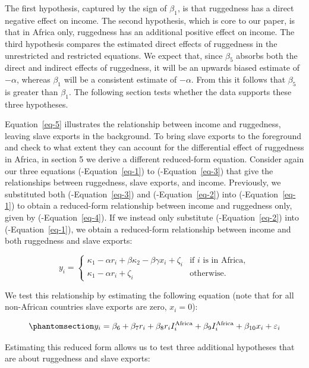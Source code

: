 \documentclass[
  letterpaper,
  DIV=11,
  numbers=noendperiod]{scrartcl}
\begin{document}
The first hypothesis, captured by the sign of \(\beta_1\), is that
ruggedness has a direct negative effect on income. The second
hypothesis, which is core to our paper, is that in Africa only,
ruggedness has an additional positive effect on income. The third
hypothesis compares the estimated direct effects of ruggedness in the
unrestricted and restricted equations. We expect that, since \(\beta_5\)
absorbs both the direct and indirect effects of ruggedness, it will be
an upwards biased estimate of \(-\alpha\), whereas \(\beta_1\) will be a
consistent estimate of \(-\alpha\). From this it follows that
\(\beta_5\) is greater than \(\beta_1\). The following section tests
whether the data supports these three hypotheses.

Equation~\ref{eq-5} illustrates the relationship between income and
ruggedness, leaving slave exports in the background. To bring slave
exports to the foreground and check to what extent they can account for
the differential effect of ruggedness in Africa, in section 5 we derive
a different reduced-form equation. Consider again our three equations
(-Equation~\ref{eq-1}) to (-Equation~\ref{eq-3}) that give the
relationships between ruggedness, slave exports, and income. Previously,
we substituted both (-Equation~\ref{eq-3}) and (-Equation~\ref{eq-2})
into (-Equation~\ref{eq-1}) to obtain a reduced-form relationship
between income and ruggedness only, given by (-Equation~\ref{eq-4}). If
we instead only substitute (-Equation~\ref{eq-2}) into
(-Equation~\ref{eq-1}), we obtain a reduced-form relationship between
income and both ruggedness and slave exports:

\[
y_i = \begin{cases}
\kappa_1 - \alpha r_i + \beta \kappa_2 - \beta \gamma x_i + \zeta_i &\text{if }i\text{ is in Africa}, \\
\kappa_1 - \alpha r_i + \zeta_i &\text{otherwise}.
\end{cases}
\]

We test this relationship by estimating the following equation (note
that for all non-African countries slave exports are zero, \(x_i = 0\)):

\begin{equation}\phantomsection\label{eq-7}{
y_i = \beta_6 + \beta_7 r_i + \beta_8 r_i I_i^\text{Africa} + \beta_9 I_i^\text{Africa} + \beta_{10}x_i + \varepsilon_i
}\end{equation}

Estimating this reduced form allows us to test three additional
hypotheses that are about ruggedness and slave exports:
\end{document}
